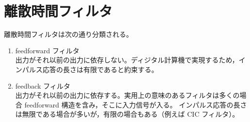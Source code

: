 \chapter{離散時間フィルタ}
    離散時間フィルタは次の通り分類される。
    \begin{enumerate}
        \item feedforward フィルタ\\
        出力がそれ以前の出力に依存しない。ディジタル計算機で実現するため，インパルス応答の長さは有限であると約束する。
        \item feedback フィルタ\\
        出力がそれ以前の出力に依存する。実用上の意味のあるフィルタは多くの場合 feedforward 構造を含み，そこに入力信号が入る。
        インパルス応答の長さは無限である場合が多いが，有限の場合もある（例えば CIC フィルタ）。
    \end{enumerate}
    
    
    
    
    
